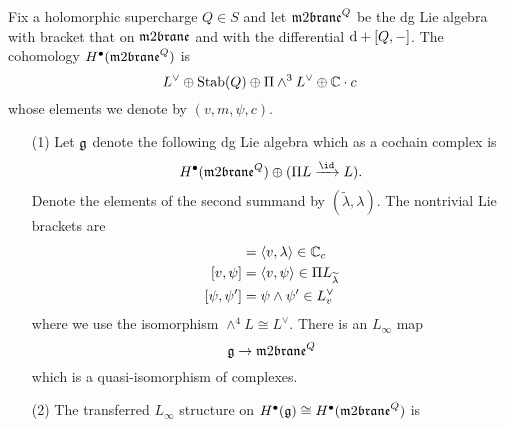 \documentclass[11pt]{amsart}
\begin{document}
\begin{prop}\label{prop:model}
Fix a holomorphic supercharge $Q \in S$ and let $\m2^Q$ be the dg Lie algebra with bracket that on $\m2$ and with the differential ${\rm d} + [Q,-]$. 
The cohomology $H^\bu(\m2^Q)$ is
\[
    L^\vee \oplus {\rm Stab}(Q) \oplus \Pi \wedge^3 L^\vee \oplus \mathbb C\cdot c
  \]
whose elements we denote by $(v, m, \psi, c)$. 
\begin{itemize}
\item[(1)] 
Let $\mathfrak g$ denote the following dg Lie algebra which as a cochain complex is
\[
H^\bu(\m2^Q) \oplus (\Pi L \xto{\id} L)  .
\]
Denote the elements of the second summand by $(\tilde{\lambda}, \lambda)$. 
The nontrivial Lie brackets are
\begin{align*}
[v,\lambda] & = \<v, \lambda\> \in \CC_c \\ 
[v,\psi] & = \<v, \psi\> \in \Pi L_{\Tilde{\lambda}} \\
[\psi, \psi'] & = \psi \wedge \psi' \in L^\vee_v 
\end{align*}
where we use the isomorphism $\wedge^4 L \cong L^\vee$.
There is an $L_\infty$ map 
\[
\fg \to \m2^Q
\] 
which is a quasi-isomorphism of complexes.  
\item[(2)]
  The transferred $L_\infty$ structure on $H^\bu(\fg) \cong H^\bu(\m2^Q)$ is 
\end{itemize}
\end{prop}
\end{document}
